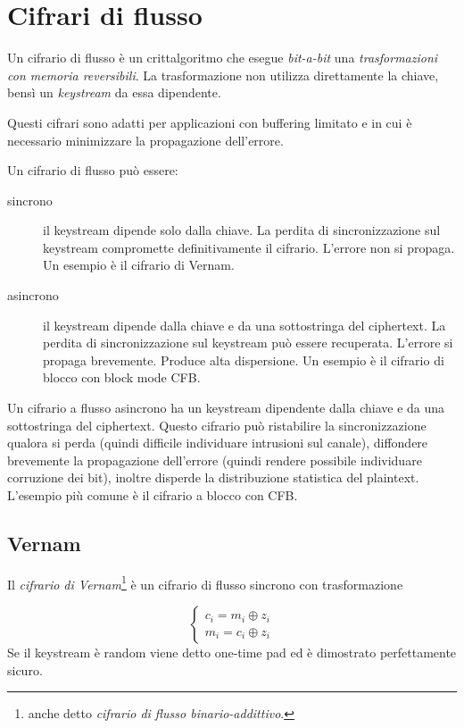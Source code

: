 \chapter{Cifrari di flusso}
\label{chp:stream-ciphers}

Un cifrario di flusso è un crittalgoritmo che esegue \textit{bit-a-bit} una \textit{trasformazioni con memoria reversibili}. La trasformazione non utilizza direttamente la chiave, bensì un \textit{keystream} da essa dipendente.

Questi cifrari sono adatti per applicazioni con buffering limitato e in cui è necessario minimizzare la propagazione dell'errore.

Un cifrario di flusso può essere:

\begin{description}
  \item[sincrono] il keystream dipende solo dalla chiave. La perdita di sincronizzazione sul keystream compromette definitivamente il cifrario. L'errore non si propaga. Un esempio è il cifrario di Vernam.
  \item[asincrono] il keystream dipende dalla chiave e da una sottostringa del ciphertext. La perdita di sincronizzazione sul keystream può essere recuperata. L'errore si propaga brevemente. Produce alta dispersione. Un esempio è il cifrario di blocco con block mode CFB.
\end{description}

Un cifrario a flusso asincrono ha un keystream dipendente dalla chiave e da una sottostringa del ciphertext.
Questo cifrario può ristabilire la sincronizzazione qualora si perda (quindi difficile individuare intrusioni sul canale), diffondere brevemente la propagazione dell'errore (quindi rendere possibile individuare corruzione dei bit), inoltre disperde la distribuzione statistica del plaintext. L'esempio più comune è il cifrario a blocco con CFB.


\section{Vernam}
Il \textit{cifrario di Vernam}\footnote{anche detto \textit{cifrario di flusso binario-addittivo}.} è un cifrario di flusso sincrono con trasformazione

\begin{equation}
  \begin{cases}
    c_{i}=m_{i} \oplus z_{i} \\
    m_{i}=c_{i} \oplus z_{i}
  \end{cases}
\end{equation}
Se il keystream è random viene detto one-time pad ed è dimostrato perfettamente sicuro.


